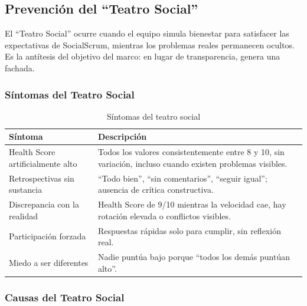 \subsection{Prevención del ``Teatro Social''}

El ``Teatro Social'' ocurre cuando el equipo simula bienestar para satisfacer las expectativas de SocialScrum, mientras los problemas reales permanecen ocultos. Es la antítesis del objetivo del marco: en lugar de transparencia, genera una fachada.

\subsubsection{Síntomas del Teatro Social}

\begin{table}[h]
    \centering
    \small
    \begin{tabularx}{\textwidth}{|l|X|}
        \hline
        \textbf{Síntoma} & \textbf{Descripción}                                                                                       \\
        \hline
        Health Score artificialmente alto
                         & Todos los valores consistentemente entre 8 y 10, sin variación, incluso cuando existen problemas visibles. \\
        \hline
        Retrospectivas sin sustancia
                         & “Todo bien”, “sin comentarios”, “seguir igual”; ausencia de crítica constructiva.                          \\
        \hline
        Discrepancia con la realidad
                         & Health Score de 9/10 mientras la velocidad cae, hay rotación elevada o conflictos visibles.                \\
        \hline
        Participación forzada
                         & Respuestas rápidas solo para cumplir, sin reflexión real.                                                  \\
        \hline
        Miedo a ser diferentes
                         & Nadie puntúa bajo porque “todos los demás puntúan alto”.                                                   \\
        \hline
    \end{tabularx}
    \caption{Síntomas del teatro social}
    \label{tab:sintomas-teatro}
\end{table}
\FloatBarrier

\subsubsection{Causas del Teatro Social}

